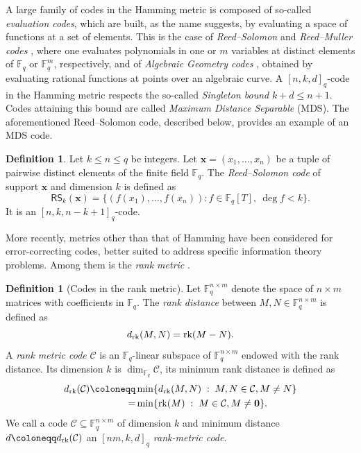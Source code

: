 \documentclass[11pt]{article}
\theoremstyle{definition}
\newtheorem{definition}[theorem]{Definition}
\renewcommand\leq{\leqslant}
\newcommand\Fq{\mathbb{F}_q}
\newcommand\rk{\text{\rm rk}}
\begin{document}
A large family of codes in the Hamming metric is composed of so-called \emph{evaluation codes}, which are built, as the name suggests, by evaluating a space of functions at a set of elements. This is the case of \emph{Reed--Solomon} \cite{RS60} and \emph{Reed--Muller codes} \cite{reed1954class, muller1954application}, where one evaluates polynomials in one or $m$ variables at distinct elements of $\Fq$ or $\Fq^m$, respectively, and of \emph{Algebraic Geometry codes} \cite{Goppa81}, obtained by evaluating rational functions at points over an algebraic curve. A $[n,k,d]_q$-code in the Hamming metric respects the so-called \emph{Singleton bound} $k+d\leq n+1$. Codes attaining this bound are called \emph{Maximum Distance Separable} (MDS). The aforementioned Reed--Solomon code, described below, provides an example of an MDS code.

\begin{definition}
Let $k \leq n \leq q$ be integers. Let $\mathbf{x}=(x_1,\dots,x_n)$ be a tuple of pairwise distinct elements of the finite field $\Fq$. The \emph{Reed--Solomon code} of support $\mathbf{x}$ and dimension $k$ is defined as
    \[\textsf{RS}_k(\mathbf{x})=\{(f(x_1),\dots,f(x_n)) : f \in \Fq[T], \: \deg f < k \}.\]
    It is an $[n,k,n-k+1]_q$-code.
\end{definition}

More recently, metrics other than that of Hamming have been considered for error-correcting codes, better suited to address specific information theory problems. Among them is the \emph{rank metric} \cite{Delsarte}. 

\begin{definition}[Codes in the rank metric] 
Let $\Fq^{n\times m}$ denote the space of $n\times m$ matrices with coefficients in $\Fq$. The \emph{rank distance} between $M,N\in\Fq^{n\times m}$ is defined as 
\[d_\rk(M,N)=\rk(M-N).\]
A \emph{rank metric code} $\mathcal{C}$ is an $\Fq$-linear subspace of $\Fq^{n\times m}$ endowed with the rank distance. Its dimension $k$ is  $\dim_{\Fq} \mathcal{C}$, its minimum rank distance is defined as 
\begin{align*}
d_\rk(\mathcal{C})\coloneqq
&\min\{d_\rk(M,N)\;:\; M,N\in\mathcal{C},M\neq N\}\\
=&\min\{\rk(M)\;:\; M\in\mathcal{C},M\neq \boldsymbol{0}\}.
\end{align*}
We call a code $\mathcal{C}\subseteq \Fq^{n\times m}$ of dimension $k$ and minimum distance $d \coloneqq d_\rk(\mathcal{C})$ an \emph{$[nm,k,d]_q$ rank-metric code}. 
\end{definition}
\end{document}
